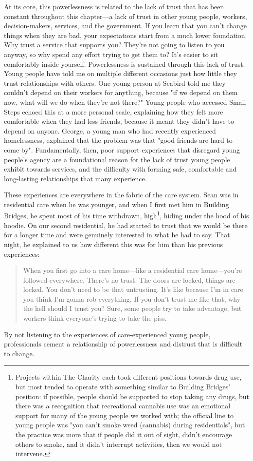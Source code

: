 At its core, this powerlessness is related to the lack of trust that has been constant throughout this chapter—a lack of trust in other young people, workers, decision-makers, services, and the government. If you learn that you can't change things when they are bad, your expectations start from a much lower foundation. Why trust a service that supports you? They're not going to listen to you anyway, so why spend any effort trying to get them to? It's easier to sit comfortably inside yourself. Powerlessness is sustained through this lack of trust. Young people have told me on multiple different occasions just how little they trust relationships with others. One young person at Seabird told me they couldn't depend on their workers for anything, because "if we depend on them now, what will we do when they're not there?" Young people who accessed Small Steps echoed this at a more personal scale, explaining how they felt more comfortable when they had less friends, because it meant they didn't have to depend on anyone. George, a young man who had recently experienced homelessness, explained that the problem was that "good friends are hard to come by". Fundamentally, then, poor support experiences that disregard young people’s agency are a foundational reason for the lack of trust young people exhibit towards services, and the difficulty with forming safe, comfortable and long-lasting relationships that many experience. 

These experiences are everywhere in the fabric of the care system. Sean was in residential care when he was younger, and when I first met him in Building Bridges, he spent most of his time withdrawn, high\footnote{Projects within The Charity each took different positions towards drug use, but most tended to operate with something similar to Building Bridges’ position: if possible, people should be supported to stop taking any drugs, but there was a recognition that recreational cannabis use was an emotional support for many of the young people we worked with; the official line to young people was "you can’t smoke weed (cannabis) during residentials", but the practice was more that if people did it out of sight, didn’t encourage others to smoke, and it didn’t interrupt activities, then we would not intervene.},  hiding under the hood of his hoodie. On our second residential, he had started to trust that we would be there for a longer time and were genuinely interested in what he had to say. That night, he explained to us how different this was for him than his previous experiences:
\begin{quote}
When you first go into a care home—like a residential care home—you're followed everywhere. There's no trust. The doors are locked, things are locked. You don't need to be that untrusting. It's like because I'm in care you think I'm gonna rob everything. If you don't trust me like that, why the hell should I trust you? Sure, some people try to take advantage, but workers think everyone's trying to take the piss.
\end{quote}
By not listening to the experiences of care-experienced young people, professionals cement a relationship of powerlessness and distrust that is difficult to change.

